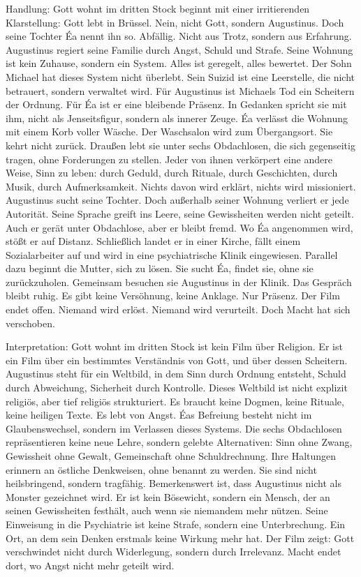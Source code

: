 \documentclass[
  ngerman,
]{article}
\begin{document}
Handlung: Gott wohnt im dritten Stock beginnt mit einer irritierenden
Klarstellung: Gott lebt in Brüssel. Nein, nicht Gott, sondern
Augustinus. Doch seine Tochter Éa nennt ihn so. Abfällig. Nicht aus
Trotz, sondern aus Erfahrung. Augustinus regiert seine Familie durch
Angst, Schuld und Strafe. Seine Wohnung ist kein Zuhause, sondern ein
System. Alles ist geregelt, alles bewertet. Der Sohn Michael hat dieses
System nicht überlebt. Sein Suizid ist eine Leerstelle, die nicht
betrauert, sondern verwaltet wird. Für Augustinus ist Michaels Tod ein
Scheitern der Ordnung. Für Éa ist er eine bleibende Präsenz. In Gedanken
spricht sie mit ihm, nicht als Jenseitsfigur, sondern als innerer Zeuge.
Éa verlässt die Wohnung mit einem Korb voller Wäsche. Der Waschsalon
wird zum Übergangsort. Sie kehrt nicht zurück. Draußen lebt sie unter
sechs Obdachlosen, die sich gegenseitig tragen, ohne Forderungen zu
stellen. Jeder von ihnen verkörpert eine andere Weise, Sinn zu leben:
durch Geduld, durch Rituale, durch Geschichten, durch Musik, durch
Aufmerksamkeit. Nichts davon wird erklärt, nichts wird missioniert.
Augustinus sucht seine Tochter. Doch außerhalb seiner Wohnung verliert
er jede Autorität. Seine Sprache greift ins Leere, seine Gewissheiten
werden nicht geteilt. Auch er gerät unter Obdachlose, aber er bleibt
fremd. Wo Éa angenommen wird, stößt er auf Distanz. Schließlich landet
er in einer Kirche, fällt einem Sozialarbeiter auf und wird in eine
psychiatrische Klinik eingewiesen. Parallel dazu beginnt die Mutter,
sich zu lösen. Sie sucht Éa, findet sie, ohne sie zurückzuholen.
Gemeinsam besuchen sie Augustinus in der Klinik. Das Gespräch bleibt
ruhig. Es gibt keine Versöhnung, keine Anklage. Nur Präsenz. Der Film
endet offen. Niemand wird erlöst. Niemand wird verurteilt. Doch Macht
hat sich verschoben.

Interpretation: Gott wohnt im dritten Stock ist kein Film über Religion.
Er ist ein Film über ein bestimmtes Verständnis von Gott, und über
dessen Scheitern. Augustinus steht für ein Weltbild, in dem Sinn durch
Ordnung entsteht, Schuld durch Abweichung, Sicherheit durch Kontrolle.
Dieses Weltbild ist nicht explizit religiös, aber tief religiös
strukturiert. Es braucht keine Dogmen, keine Rituale, keine heiligen
Texte. Es lebt von Angst. Éas Befreiung besteht nicht im
Glaubenswechsel, sondern im Verlassen dieses Systems. Die sechs
Obdachlosen repräsentieren keine neue Lehre, sondern gelebte
Alternativen: Sinn ohne Zwang, Gewissheit ohne Gewalt, Gemeinschaft ohne
Schuldrechnung. Ihre Haltungen erinnern an östliche Denkweisen, ohne
benannt zu werden. Sie sind nicht heilsbringend, sondern tragfähig.
Bemerkenswert ist, dass Augustinus nicht als Monster gezeichnet wird. Er
ist kein Bösewicht, sondern ein Mensch, der an seinen Gewissheiten
festhält, auch wenn sie niemandem mehr nützen. Seine Einweisung in die
Psychiatrie ist keine Strafe, sondern eine Unterbrechung. Ein Ort, an
dem sein Denken erstmals keine Wirkung mehr hat. Der Film zeigt: Gott
verschwindet nicht durch Widerlegung, sondern durch Irrelevanz. Macht
endet dort, wo Angst nicht mehr geteilt wird.
\end{document}
